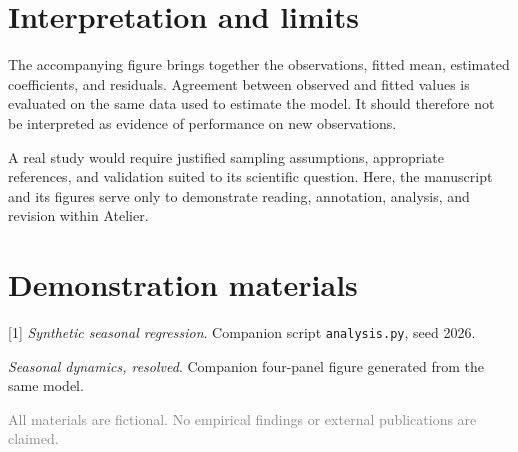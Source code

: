 \documentclass[10pt]{article}
\begin{document}
\section{Interpretation and limits}
The accompanying figure brings together the observations, fitted mean, estimated coefficients, and residuals. Agreement between observed and fitted values is evaluated on the same data used to estimate the model. It should therefore not be interpreted as evidence of performance on new observations.

A real study would require justified sampling assumptions, appropriate references, and validation suited to its scientific question. Here, the manuscript and its figures serve only to demonstrate reading, annotation, analysis, and revision within Atelier.
\section*{Demonstration materials}
\small
[1] \textit{Synthetic seasonal regression}. Companion script \texttt{analysis.py}, seed 2026.\par
[2] \textit{Seasonal dynamics, resolved}. Companion four-panel figure generated from the same model.\par
\textcolor{gray}{All materials are fictional. No empirical findings or external publications are claimed.}
\end{document}
